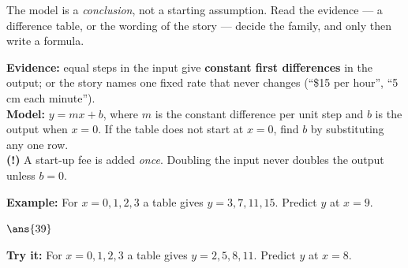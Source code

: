 \documentclass[12pt]{article}
\begin{document}

\noindent\small The model is a \emph{conclusion}, not a starting assumption.
Read the evidence --- a difference table, or the wording of the story --- decide
the family, and only then write a formula.
\normalsize

\begin{formulabox}
\textbf{Evidence:} equal steps in the input give \textbf{constant first
differences} in the output; or the story names one fixed rate that never
changes (``\$15 per hour'', ``5 cm each minute'').\\[3pt]
\textbf{Model:} $y = mx + b$, where $m$ is the constant difference per unit
step and $b$ is the output when $x = 0$. If the table does not start at
$x = 0$, find $b$ by substituting any one row.\\[3pt]
\textbf{(!)} A start-up fee is added \emph{once}. Doubling the input never
doubles the output unless $b = 0$.
\end{formulabox}
\begin{examplebox}
\textbf{Example:} For $x = 0, 1, 2, 3$ a table gives $y = 3, 7, 11, 15$.
Predict $y$ at $x = 9$.
\par
$\ans{39}$
\end{examplebox}
\begin{tryitbox}
\textbf{Try it:} For $x = 0, 1, 2, 3$ a table gives $y = 2, 5, 8, 11$. Predict
$y$ at $x = 8$.\\[2pt]
\end{tryitbox}
\end{document}
